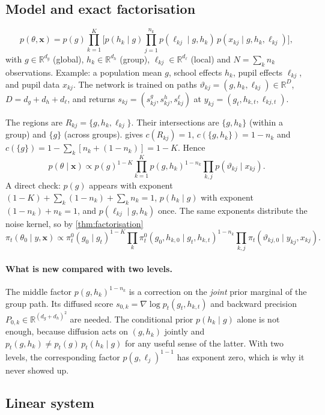\documentclass[11pt]{article}
\theoremstyle{definition}
\theoremstyle{remark}
\newcommand{\R}{\mathbb{R}}
\newcommand{\X}{\mathbf{x}}
\begin{document}
\subsection{Model and exact factorisation}

\[
p(\theta,\X)=p(g)\prod_{k=1}^{K}\Big[p(h_k\mid g)\prod_{j=1}^{n_k}p(\ell_{kj}\mid g,h_k)\,p(x_{kj}\mid g,h_k,\ell_{kj})\Big],
\]
with $g\in\R^{d_g}$ (global), $h_k\in\R^{d_h}$ (group), $\ell_{kj}\in\R^{d_\ell}$
(local) and $N=\sum_kn_k$ observations. Example: a population mean $g$, school
effects $h_k$, pupil effects $\ell_{kj}$, and pupil data $x_{kj}$. The network is
trained on paths $\vartheta_{kj}=(g,h_k,\ell_{kj})\in\R^{D}$, $D=d_g+d_h+d_\ell$,
and returns $s_{kj}=(s^g_{kj},s^h_{kj},s^\ell_{kj})$ at
$y_{kj}=(g_t,h_{k,t},\ell_{kj,t})$.

The regions are $R_{kj}=\{g,h_k,\ell_{kj}\}$. Their intersections are $\{g,h_k\}$
(within a group) and $\{g\}$ (across groups).  gives
$c(R_{kj})=1$, $c(\{g,h_k\})=1-n_k$ and $c(\{g\})=1-\sum_k[n_k+(1-n_k)]=1-K$.
Hence
\begin{equation}\label{eq:three-factorisation}
p(\theta\mid\X)\propto p(g)^{1-K}\prod_{k=1}^{K}p(g,h_k)^{1-n_k}\prod_{k,j}p(\vartheta_{kj}\mid x_{kj}).
\end{equation}
A direct check: $p(g)$ appears with exponent $(1-K)+\sum_k(1-n_k)+\sum_kn_k=1$,
$p(h_k\mid g)$ with exponent $(1-n_k)+n_k=1$, and $p(\ell_{kj}\mid g,h_k)$
once. The same exponents distribute the noise kernel, so by
\cref{thm:factorisation}
\[
\pi_t(\theta_0\mid y,\X)\propto\pi_t^0(g_0\mid g_t)^{1-K}\prod_k\pi_t^0(g_0,h_{k,0}\mid g_t,h_{k,t})^{1-n_k}\prod_{k,j}\pi_t(\vartheta_{kj,0}\mid y_{kj},x_{kj}).
\]

\paragraph{What is new compared with two levels.} The middle factor
$p(g,h_k)^{1-n_k}$ is a correction on the \emph{joint} prior marginal of the
group path. Its diffused score $s_{0,k}=\nabla\log p_t(g_t,h_{k,t})$ and backward
precision $P_{0,k}\in\R^{(d_g+d_h)^2}$ are needed. The conditional prior
$p(h_k\mid g)$ alone is not enough, because diffusion acts on $(g,h_k)$ jointly
and $p_t(g,h_k)\neq p_t(g)\,p_t(h_k\mid g)$ for any useful sense of the latter.
With two levels, the corresponding factor $p(g,\ell_j)^{1-1}$ has exponent zero,
which is why it never showed up.

\subsection{Linear system}
\end{document}
